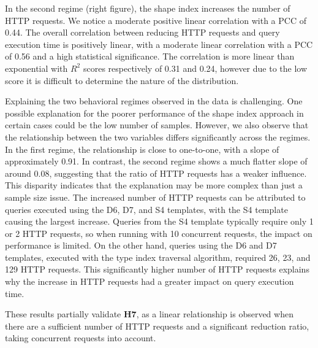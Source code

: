 In the second regime (right figure), the shape index increases the number of HTTP requests.
We notice a moderate positive linear correlation with a PCC of 0.44.
The overall correlation between reducing HTTP requests and query execution time is positively linear, with a moderate linear correlation with a PCC of 0.56 and a high statistical significance.
The correlation is more linear than exponential with $R^2$ scores respectively of 0.31 and 0.24, however due to the low score it is difficult to determine the nature of the distribution.

Explaining the two behavioral regimes observed in the data is challenging.
One possible explanation for the poorer performance of the shape index approach in certain cases could be the low number of samples.
However, we also observe that the relationship between the two variables differs significantly across the regimes.
In the first regime, the relationship is close to one-to-one, with a slope of approximately 0.91.
In contrast, the second regime shows a much flatter slope of around 0.08, suggesting that the ratio of HTTP requests has a weaker influence.
This disparity indicates that the explanation may be more complex than just a sample size issue.
The increased number of HTTP requests can be attributed to queries executed using the D6, D7, and S4 templates, with the S4 template causing the largest increase.
Queries from the S4 template typically require only 1 or 2 HTTP requests, so when running with 10 concurrent requests, the impact on performance is limited.
On the other hand, queries using the D6 and D7 templates, executed with the type index traversal algorithm, required 26, 23, and 129 HTTP requests.
This significantly higher number of HTTP requests explains why the increase in HTTP requests had a greater impact on query execution time.

These results partially validate \textbf{H7}, as a linear relationship is observed when there are a sufficient number of HTTP requests and a significant reduction ratio, taking concurrent requests into account.
